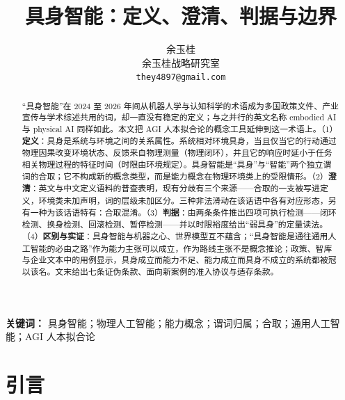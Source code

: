 \documentclass[10pt,fontset=fandol]{ctexart}
\title{具身智能：定义、澄清、判据与边界}
\author{余玉桂\\ 余玉桂战略研究室\\ \texttt{they4897@gmail.com}}
\date{}
\begin{document}
\maketitle

\begin{abstract}
\noindent “具身智能”在 2024 至 2026 年间从机器人学与认知科学的术语成为多国政策文件、产业宣传与学术综述共用的词，却一直没有稳定的定义；与之并行的英文名称 embodied AI 与 physical AI 同样如此。本文把 AGI 人本拟合论的概念工具延伸到这一术语上。（1）\textbf{定义}：具身是系统与环境之间的关系属性。系统相对环境具身，当且仅当它的行动通过物理因果改变环境状态、反馈来自物理测量（物理闭环），并且它的响应时延小于任务相关物理过程的特征时间（时限由环境规定）。具身智能是“具身”与“智能”两个独立谓词的合取；它不构成新的概念类型，而是能力概念在物理环境类上的受限情形。（2）\textbf{澄清}：英文与中文定义语料的普查表明，现有分歧有三个来源——合取的一支被写进定义，环境类未加声明，词的层级未加区分。三种非法滑动在该话语中各有对应形态，另有一种为该话语特有：合取混淆。（3）\textbf{判据}：由两条条件推出四项可执行检测——闭环检测、换身检测、回滚检测、暂停检测——并以时限裕度给出“弱具身”的定量读法。（4）\textbf{区别与实证}：具身智能与机器之心、世界模型互不蕴含；“具身智能是通往通用人工智能的必由之路”作为能力主张可以成立，作为路线主张不是概念推论；政策、智库与企业文本中的用例显示，具身成立而能力不足、能力成立而具身不成立的系统都被冠以该名。文末给出七条证伪条款、面向新案例的准入协议与适存条款。
\end{abstract}

\medskip
\noindent\textbf{关键词：} 具身智能；物理人工智能；能力概念；谓词归属；合取；通用人工智能；AGI 人本拟合论


\section{引言}\label{sec:s1}
\end{document}
